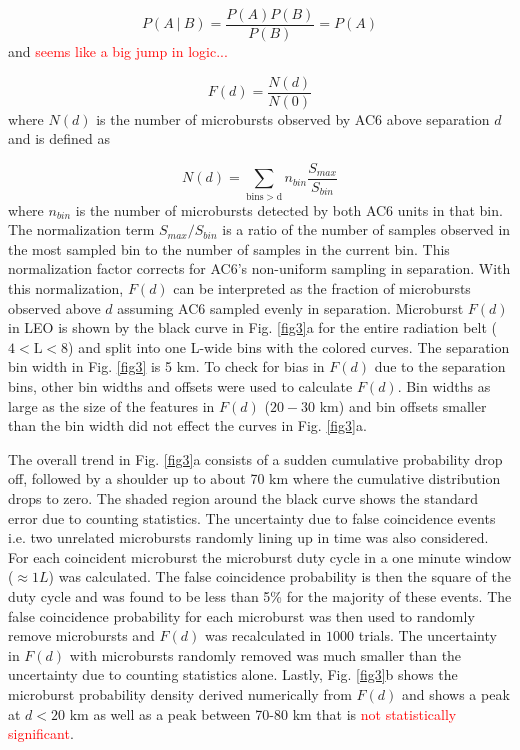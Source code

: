 \documentclass[draft]{agujournal2019}
\begin{document}
\begin{equation}
P(A \ \vert \ B) = \frac{P(A)P(B)}{P(B)} = P(A)
\end{equation} and \textcolor{red}{seems like a big jump in logic...}

\begin{equation}
F(d) = \frac{N(d)}{N(0)}
\end{equation} where $N(d)$ is the number of microbursts observed by AC6 above separation $d$ and is defined as

\begin{equation}
N(d) = \sum_{\mathrm{bins > d}} n_{bin} \frac{S_{max}}{S_{bin}}
\end{equation} where $n_{bin}$ is the number of microbursts detected by both AC6 units in that bin. The normalization term $S_{max}/S_{bin}$ is a ratio of the number of samples observed in the most sampled bin to the number of samples in the current bin. This normalization factor corrects for AC6's non-uniform sampling in separation. With this normalization, $F(d)$ can be interpreted as the fraction of microbursts observed above $d$ assuming AC6 sampled evenly in separation. Microburst $F(d)$ in LEO is shown by the black curve in Fig. \ref{fig3}a for the entire radiation belt ($4 < \mathrm{L}< 8$) and split into one L-wide bins with the colored curves. The separation bin width in Fig. \ref{fig3} is 5 km. To check for bias in $F(d)$ due to the separation bins, other bin widths and offsets were used to calculate $F(d)$. Bin widths as large as the size of the features in $F(d)$ ($20-30$ km) and bin offsets smaller than the bin width did not effect the curves in Fig. \ref{fig3}a.

The overall trend in Fig. \ref{fig3}a consists of a sudden cumulative probability drop off, followed by a shoulder up to about 70 km where the cumulative distribution drops to zero. The shaded region around the black curve shows the standard error due to counting statistics. The uncertainty due to false coincidence events i.e. two unrelated microbursts randomly lining up in time was also considered. For each coincident microburst the microburst duty cycle in a one minute window ($\approx 1 L$) was calculated. The false coincidence probability is then the square of the duty cycle and was found to be less than 5\% for the majority of these events. The false coincidence probability for each microburst was then used to randomly remove microbursts and $F(d)$ was recalculated in $1000$ trials. The uncertainty in $F(d)$ with microbursts randomly removed was much smaller than the uncertainty due to counting statistics alone. Lastly, Fig. \ref{fig3}b shows the microburst probability density derived numerically from $F(d)$ and shows a peak at $d < 20 $ km as well as a peak between 70-80 km that is \textcolor{red}{not statistically significant}. 
\end{document}
